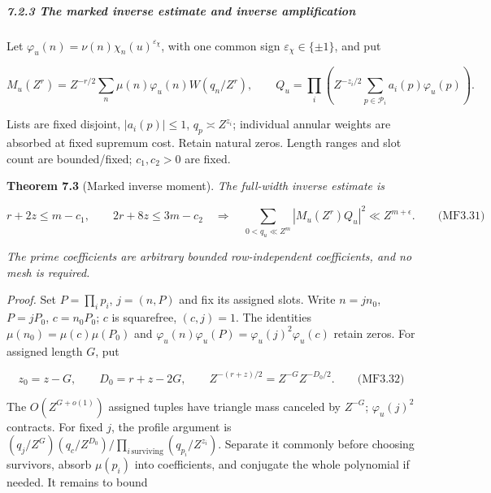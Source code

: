 \hypertarget{the-marked-inverse-estimate-and-inverse-amplification}{}

\label{the-marked-inverse-estimate-and-inverse-amplification}

\hypertarget{the-marked-inverse-estimate-and-inverse-amplification-heading-2}{%
\subparagraph{7.2.3 The marked inverse estimate and inverse amplification}}

Let \(\varphi_u(n)=\nu(n)\chi_n(u)^{\varepsilon_\chi}\), with one common sign \(\varepsilon_\chi\in\{\pm1\}\), and put

\[
M_u(Z^r)=Z^{-r/2}\sum_n\mu(n)\varphi_u(n)W(q_n/Z^r),\qquad
Q_u=\prod_i\left(Z^{-z_i/2}\sum_{p\in\mathcal P_i}a_i(p)\varphi_u(p)\right).
\]

Lists are fixed disjoint, \(|a_i(p)|\le1\), \(q_p\asymp Z^{z_i}\); individual annular weights are absorbed at fixed supremum cost. Retain natural zeros. Length ranges and slot count are bounded/fixed; \(c_1,c_2>0\) are fixed.

\textbf{Theorem 7.3} (Marked inverse moment). \emph{\hypertarget{mf:inverse}{}\label{mf:inverse}The full-width inverse estimate is \hypertarget{mf:eq:B3.31}{}\label{mf:eq:B3.31}}

\[
r+2z\le m-c_1,\qquad2r+8z\le3m-c_2
\quad\Longrightarrow\quad
\sum_{0<q_u\ll Z^m}|M_u(Z^r)Q_u|^2\ll Z^{m+\epsilon}.
\qquad\text{(MF3.31)}
\]

\emph{The prime coefficients are arbitrary bounded row-independent coefficients, and no mesh is required.}

\emph{Proof.} Set \(P=\prod_i p_i\), \(j=(n,P)\) and fix its assigned slots. Write \(n=jn_0\), \(P=jP_0\), \(c=n_0P_0\); \(c\) is squarefree, \((c,j)=1\). The identities \(\mu(n_0)=\mu(c)\mu(P_0)\) and \(\varphi_u(n)\varphi_u(P)=\varphi_u(j)^2\varphi_u(c)\) retain zeros. For assigned length \(G\), put

\hypertarget{mf:eq:B3.32}{}

\label{mf:eq:B3.32}

\[
z_0=z-G,\qquad D_0=r+z-2G,
\qquad Z^{-(r+z)/2}=Z^{-G}Z^{-D_0/2}.
\qquad\text{(MF3.32)}
\]

The \(O(Z^{G+o(1)})\) assigned tuples have triangle mass canceled by \(Z^{-G}\); \(\varphi_u(j)^2\) contracts. For fixed \(j\), the profile argument is \((q_j/Z^G)(q_c/Z^{D_0})/\prod_{i\,\mathrm{surviving}}(q_{p_i}/Z^{z_i})\). Separate it commonly before choosing survivors, absorb \(\mu(p_i)\) into coefficients, and conjugate the whole polynomial if needed. It remains to bound

